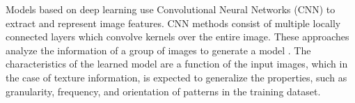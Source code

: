 Models based on deep learning use Convolutional Neural Networks (CNN) to extract and represent image features. CNN methods consist of multiple locally connected layers which convolve kernels over the entire image. These approaches analyze the information of a group of images to generate a model \citep{Lin.Maji:CVPR:2016}. The characteristics of the learned model are a function of the input images, which in the case of texture information, is expected to generalize the properties, such as granularity, frequency, and orientation of patterns in the training dataset.


